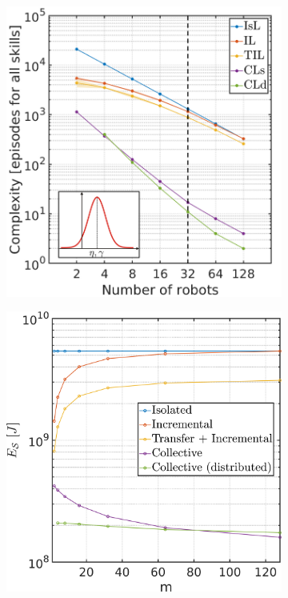 \documentclass[12pt]{article}
\begin{document}
\begin{figure}[!t]
	\centering
	\hspace*{\fill}
	\begin{subfigure}[t]{0.45\textwidth}
		\subcaption{}
		\includegraphics[width= \textwidth]{sf_learning_paradigms_complexity_tmp.png} \label{fig:total_episodes_per_n_robots}
	\end{subfigure}
	\hfill
	\begin{subfigure}[t]{0.45\textwidth}
		\subcaption{}
		\includegraphics[width=\textwidth]{total_energy_per_n_robots.png} \label{fig:total_energy_per_n_robots}

\end{subfigure}
\end{figure}
\end{document}
